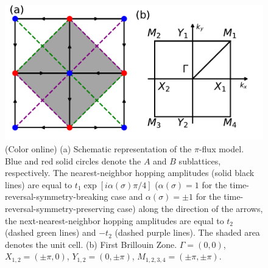 \documentclass[amsmath,superscriptaddress,showpacs,aps,prb,twocolumn]{revtex4-1}
\begin{document}
\begin{figure}
\includegraphics[width=\columnwidth]{lattice}
\caption{(Color online) (a) Schematic representation of the $\pi$-flux model. Blue and red solid circles denote the $A$ and $B$ sublattices, respectively. The nearest-neighbor hopping amplitudes (solid black lines) are equal to $t_{1}\exp[i\alpha(\sigma)\pi/4]$ ($\alpha(\sigma)=1$ for the time-reversal-symmetry-breaking case and $\alpha(\sigma)=\pm1$ for the time-reversal-symmetry-preserving case) along the direction of the arrows, the next-nearest-neighbor hopping amplitudes are equal to $t_{2}$ (dashed green lines) and $-t_{2}$ (dashed purple lines). The shaded area denotes the unit cell. (b) First Brillouin Zone. $\Gamma=(0,0)$, $X_{1,2}=(\pm\pi,0)$, $Y_{1,2}=(0,\pm\pi)$, $M_{1,2,3,4}=(\pm\pi,\pm\pi)$.}
\label{lattice}
\end{figure}
\end{document}
